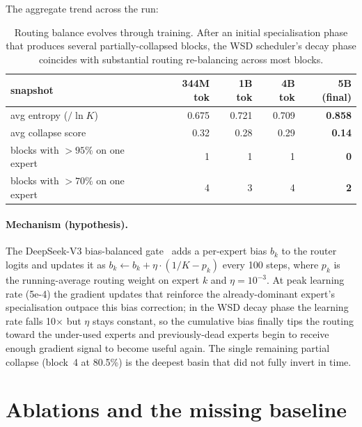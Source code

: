 \documentclass[11pt]{article}
\begin{document}
The aggregate trend across the run:

\begin{table}[h]
\centering
\small
\begin{tabular}{lrrrr}
\toprule
\textbf{snapshot} & 344M tok & 1B tok & 4B tok & \textbf{5B (final)} \\
\midrule
avg entropy ($/\ln K$)          & 0.675 & 0.721 & 0.709 & \textbf{0.858} \\
avg collapse score              & 0.32  & 0.28  & 0.29  & \textbf{0.14}  \\
blocks with $>95\%$ on one expert & 1     & 1     & 1     & \textbf{0}     \\
blocks with $>70\%$ on one expert & 4     & 3     & 4     & \textbf{2}     \\
\bottomrule
\end{tabular}
\caption{Routing balance evolves through training.  After an initial
specialisation phase that produces several partially-collapsed blocks,
the WSD scheduler's decay phase coincides with substantial routing
re-balancing across most blocks.}
\label{tab:routing}
\end{table}

\paragraph{Mechanism (hypothesis).}
The DeepSeek-V3 bias-balanced
gate~\citep{liu2024deepseekv3} adds a per-expert bias $b_k$ to the
router logits and updates it as $b_k \leftarrow b_k + \eta \cdot
(1/K - p_k)$ every 100 steps, where $p_k$ is the running-average
routing weight on expert $k$ and $\eta = 10^{-3}$.  At peak learning
rate (5e-4) the gradient updates that reinforce the
already-dominant expert's specialisation outpace this bias correction;
in the WSD decay phase the learning rate falls 10$\times$ but $\eta$
stays constant, so the cumulative bias finally tips the routing
toward the under-used experts and previously-dead experts begin to
receive enough gradient signal to become useful again.  The single
remaining partial collapse (block~4 at 80.5\%) is the deepest basin
that did not fully invert in time.

\section{Ablations and the missing baseline}
\label{sec:ablations}
\end{document}
